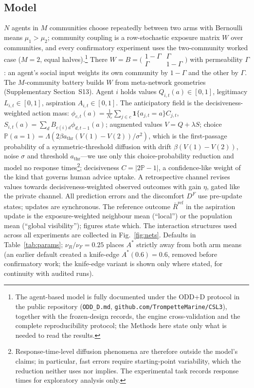 \documentclass[11pt]{article}
\newcommand{\Prob}{\mathbb{P}}
\newcommand{\1}{\mathbf{1}}
\newcommand{\Astar}{A^{*}}
\begin{document}
\subsection{Model}
$N$ agents in $M$ communities choose repeatedly between two arms with Bernoulli means $\mu_1>\mu_2$; community coupling is a row-stochastic exposure matrix $W$ over communities, and every confirmatory experiment uses the two-community worked case ($M=2$, equal halves).\footnote{The agent-based model is fully documented under the ODD+D protocol\cite{Muller2013,Grimm2020} in the public repository (\texttt{ODD\_D.md}, \texttt{github.com/TrompetteMarine/CSL3}), together with the frozen-design records, the engine cross-validation and the complete reproducibility protocol; the Methods here state only what is needed to read the results.} There $W=B=\bigl(\begin{smallmatrix}1-\Gamma & \Gamma\\ \Gamma & 1-\Gamma\end{smallmatrix}\bigr)$ with permeability $\Gamma$: an agent's social input weights its own community by $1-\Gamma$ and the other by $\Gamma$. The $M$-community battery builds $W$ from meta-network geometries (Supplementary Section~S13). Agent $i$ holds values $Q_{i,t}(a)\in[0,1]$, legitimacy $L_{i,t}\in[0,1]$, aspiration $A_{i,t}\in[0,1]$. The anticipatory field is the decisiveness-weighted action mass: $\phi_{c,t}(a)=\tfrac1{N_c}\sum_{j\in c}\1\{a_{j,t}=a\}C_{j,t}$, $S_{i,t}(a)=\sum_d B_{c(i)d}\phi_{d,t-1}(a)$; augmented values $V=Q+\lambda S$; choice $\Prob(a{=}1)=\Lambda(2\beta a_{\mathrm{thr}}(V(1)-V(2))/\sigma^2)$, which is the first-passage probability of a symmetric-threshold diffusion with drift $\beta(V(1)-V(2))$, noise $\sigma$ and threshold $a_{\mathrm{thr}}$---we use only this choice-probability reduction and model no response times\footnote{Response-time-level diffusion phenomena are therefore outside the model's claims; in particular, fast errors require starting-point variability, which the reduction neither uses nor implies. The experimental task records response times for exploratory analysis only.}; decisiveness $C=|2\Prob-1|$, a confidence-like weight of the kind that governs human advice uptake\cite{PescetelliYeung2021}. A retrospective channel revises values towards decisiveness-weighted observed outcomes with gain $\eta$, gated like the private channel. All prediction errors and the discomfort $D^F$ use pre-update states; updates are synchronous. The reference outcome $\bar R^{\mathrm{ref}}$ in the aspiration update is the exposure-weighted neighbour mean (``local'') or the population mean (``global visibility''); figures state which. The interaction structures used across all experiments are collected in Fig.~\ref{fig:nets}. Defaults in Table~\ref{tab:params}; $\nu_R/\nu_F=0.25$ places $\Astar$ strictly away from both arm means (an earlier default created a knife-edge $\Astar(0.6)=0.6$, removed before confirmatory work; the knife-edge variant is shown only where stated, for continuity with audited runs).
\end{document}
